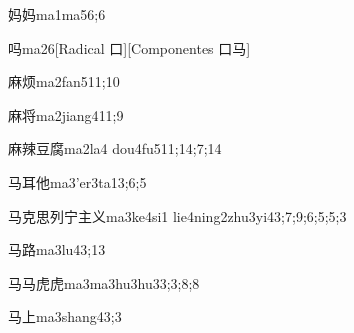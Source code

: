 
\begin{verbete}{妈妈}{ma1ma5}{6;6}
\end{verbete}

\begin{verbete}{吗}{ma2}{6}[Radical 口][Componentes 口马]
\end{verbete}

\begin{verbete}{麻烦}{ma2fan5}{11;10}
\end{verbete}

\begin{verbete}{麻将}{ma2jiang4}{11;9}
\end{verbete}

\begin{verbete}{麻辣豆腐}{ma2la4 dou4fu5}{11;14;7;14}
\end{verbete}

\begin{verbete}{马耳他}{ma3'er3ta1}{3;6;5}
\end{verbete}

\begin{verbete}{马克思列宁主义}{ma3ke4si1 lie4ning2zhu3yi4}{3;7;9;6;5;5;3}
\end{verbete}

\begin{verbete}{马路}{ma3lu4}{3;13}
\end{verbete}

\begin{verbete}{马马虎虎}{ma3ma3hu3hu3}{3;3;8;8}
\end{verbete}

\begin{verbete}{马上}{ma3shang4}{3;3}
\end{verbete}

